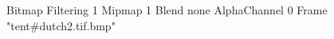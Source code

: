 {Bitmap
	{Filtering 1}
	{Mipmap 1}
	{Blend none}
	{AlphaChannel 0}
	{Frame "tent#dutch2.tif.bmp"}
}
